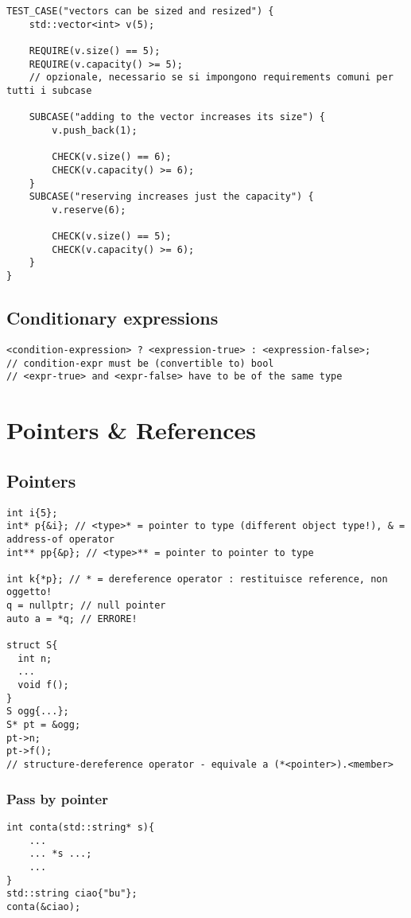 \documentclass[10pt, oneside]{Book}
\begin{document}
\begin{verbatim}
TEST_CASE("vectors can be sized and resized") {
    std::vector<int> v(5);

    REQUIRE(v.size() == 5);
    REQUIRE(v.capacity() >= 5);
    // opzionale, necessario se si impongono requirements comuni per tutti i subcase

    SUBCASE("adding to the vector increases its size") {
        v.push_back(1);

        CHECK(v.size() == 6);
        CHECK(v.capacity() >= 6);
    }
    SUBCASE("reserving increases just the capacity") {
        v.reserve(6);

        CHECK(v.size() == 5);
        CHECK(v.capacity() >= 6);
    }
}
\end{verbatim}

\section{Conditionary expressions}
\begin{verbatim}
<condition-expression> ? <expression-true> : <expression-false>;
// condition-expr must be (convertible to) bool
// <expr-true> and <expr-false> have to be of the same type 
\end{verbatim}

\chapter{Pointers \& References}

\section{Pointers}
\begin{verbatim}
int i{5};
int* p{&i}; // <type>* = pointer to type (different object type!), & = address-of operator
int** pp{&p}; // <type>** = pointer to pointer to type

int k{*p}; // * = dereference operator : restituisce reference, non oggetto!
q = nullptr; // null pointer
auto a = *q; // ERRORE!

struct S{
  int n;
  ...
  void f();
}
S ogg{...};
S* pt = &ogg;
pt->n;
pt->f();
// structure-dereference operator - equivale a (*<pointer>).<member>
\end{verbatim}
\subsection{Pass by pointer}
\begin{verbatim}
int conta(std::string* s){
    ...
    ... *s ...;
    ...
}
std::string ciao{"bu"};
conta(&ciao);
\end{verbatim}
\end{document}
